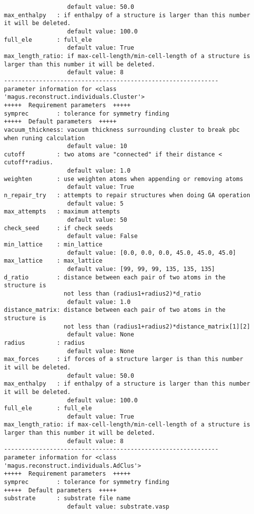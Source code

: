 \documentclass[12pt,oneside]{book}
\begin{document}
\begin{tcolorbox}
\begin{verbatim}
                  default value: 50.0
max_enthalpy   : if enthalpy of a structure is larger than this number it will be deleted.
                  default value: 100.0
full_ele       : full_ele
                  default value: True
max_length_ratio: if max-cell-length/min-cell-length of a structure is larger than this number it will be deleted.
                  default value: 8
-------------------------------------------------------------
parameter information for <class 'magus.reconstruct.individuals.Cluster'>
+++++  Requirement parameters  +++++
symprec        : tolerance for symmetry finding
+++++  Default parameters  +++++
vacuum_thickness: vacuum thickness surrounding cluster to break pbc when runing calculation
                  default value: 10
cutoff         : two atoms are "connected" if their distance < cutoff*radius.
                  default value: 1.0
weighten       : use weighten atoms when appending or removing atoms
                  default value: True
n_repair_try   : attempts to repair structures when doing GA operation
                  default value: 5
max_attempts   : maximum attempts
                  default value: 50
check_seed     : if check seeds
                  default value: False
min_lattice    : min_lattice
                  default value: [0.0, 0.0, 0.0, 45.0, 45.0, 45.0]
max_lattice    : max_lattice
                  default value: [99, 99, 99, 135, 135, 135]
d_ratio        : distance between each pair of two atoms in the structure is
                 not less than (radius1+radius2)*d_ratio
                  default value: 1.0
distance_matrix: distance between each pair of two atoms in the structure is
                 not less than (radius1+radius2)*distance_matrix[1][2]
                  default value: None
radius         : radius
                  default value: None
max_forces     : if forces of a structure larger is than this number it will be deleted.
                  default value: 50.0
max_enthalpy   : if enthalpy of a structure is larger than this number it will be deleted.
                  default value: 100.0
full_ele       : full_ele
                  default value: True
max_length_ratio: if max-cell-length/min-cell-length of a structure is larger than this number it will be deleted.
                  default value: 8
-------------------------------------------------------------
parameter information for <class 'magus.reconstruct.individuals.AdClus'>
+++++  Requirement parameters  +++++
symprec        : tolerance for symmetry finding
+++++  Default parameters  +++++
substrate      : substrate file name
                  default value: substrate.vasp

\end{verbatim}
\end{tcolorbox}
\end{document}
